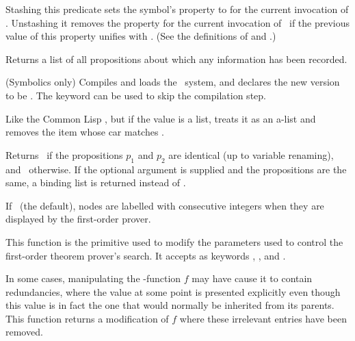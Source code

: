 \begin{list}{}{\setlength{\labelwidth}{1.5in}\setlength{\labelsep}{.25in}
\setlength{\leftmargin}{1.75in}}
\item [\itype{(property symbol value indicator)}] Stashing this
predicate sets the symbol's  property to 
for the current invocation of \mvl.  Unstashing it removes the
 property for the current invocation of \mvl\ if the
previous value of this property unifies with .  (See the
definitions of  and .)

\item [\itype{props()}] Returns a list of all propositions about
which any information has been recorded.



\item [\itype{release-mvl}] (Symbolics only)  Compiles and loads the
\mvl\ system, and declares the new version to be .  The
keyword  can be used to skip the compilation step.

\item [\itype{rem-mvl (symbol indicator)}] Like the Common Lisp
, but if the value is a list, treats it as an a-list
and removes the item whose car matches .


\item [\itype{samep(p1 p2)}] Returns \T\ if the propositions $p_1$ and
$p_2$ are identical (up to variable renaming), and \NIL\ otherwise.
If the optional  argument is supplied and the
propositions are the same, a binding list is returned instead of \T.

\item [\itype{*save-nodes*}] If \T\ (the default), nodes are
labelled with consecutive integers when they are displayed by the
first-order prover.

\item [\itype{set-search-parameters}] This function is the primitive
used to modify the parameters used to control the first-order theorem
prover's search.  It accepts as keywords ,
, and .

\item [\itype{simplify(f)}] In some cases, manipulating the
\dg-function $f$ may have cause it to contain redundancies, where the
value at some point is presented explicitly even though this value is
in fact the one that would normally be inherited from its parents.
This function returns a modification of $f$ where these irrelevant
entries have been removed.


\end{list}
